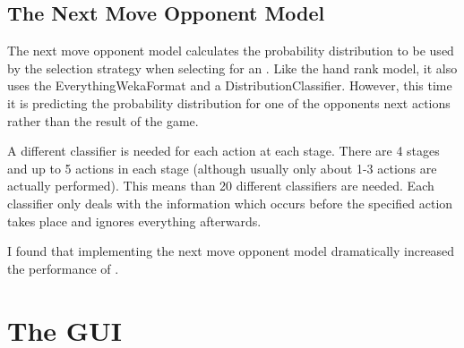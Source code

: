 \subsection{The Next Move Opponent Model}			%


\label{sec:nmom}




The next move opponent model calculates the probability distribution to be used by the selection strategy when selecting for an \opp. Like the hand rank model, it also uses the EverythingWekaFormat and a DistributionClassifier. However, this time it is predicting the probability distribution for one of the opponents next actions rather than the result of the game. 

A different classifier is needed for each action at each stage. There are 4 stages and up to 5 actions in each stage (although usually only about 1-3 actions are actually performed). This means than 20 different classifiers are needed. Each classifier only deals with the information which occurs before the specified action takes place and ignores everything afterwards. 

I found that implementing the next move opponent model dramatically increased the performance of \mbt. 













\section{The GUI}								%


